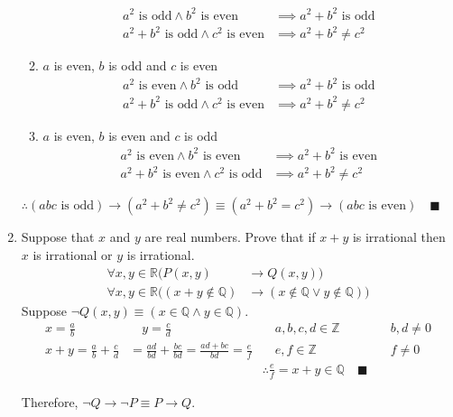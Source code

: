 \documentclass[letterpaper, 12pt]{article}
\newcommand{\qed}{\quad \blacksquare}
\newcommand{\then}{\rightarrow}
\newcommand{\rationals}{\mathbb{Q}}
\newcommand{\reals}{\mathbb{R}}
\begin{document}
\begin{enumerate}
\begin{enumerate}
    \begin{align*}
        a^2 \text{ is odd} \wedge b^2 \text{ is even} &\implies a^2 + b^2 \text{ is odd} \\
        a^2 + b^2 \text{ is odd} \wedge c^2 \text{ is even} &\implies a^2 + b^2 \ne c^2
    \end{align*}
    \item $a$ is even, $b$ is odd and $c$ is even
    \begin{align*}
        a^2 \text{ is even} \wedge b^2 \text{ is odd} &\implies a^2 + b^2 \text{ is odd} \\
        a^2 + b^2 \text{ is odd} \wedge c^2 \text{ is even} &\implies a^2 + b^2 \ne c^2
    \end{align*}
    \item $a$ is even, $b$ is even and $c$ is odd
    \begin{align*}
        a^2 \text{ is even} \wedge b^2 \text{ is even} &\implies a^2 + b^2 \text{ is even} \\
        a^2 + b^2 \text{ is even} \wedge c^2 \text{ is odd} &\implies a^2 + b^2 \ne c^2
    \end{align*}
\end{enumerate}
$\therefore (\text{$abc$ is odd}) \then (a^2 + b^2 \ne c^2) 
\equiv (a^2 + b^2 = c^2) \then (\text{$abc$ is even}) \qed$
\pagebreak
\item Suppose that $x$ and $y$ are real numbers. Prove that if $x + y$ is irrational then $x$ 
is irrational or $y$ is irrational.
\begin{align*}
    \forall x, y \in \reals (P(x, y) &\then Q(x, y)) \\
    \forall x, y \in \reals ((x + y \notin \rationals) &\then (x \notin \rationals \vee y \notin 
    \rationals))
\end{align*}
Suppose $\neg Q(x, y) \equiv (x \in \rationals \wedge y \in \rationals)$. \\
\begin{align*}
    x = \frac{a}{b} & \quad y = \frac{c}{d} &\quad a, b, c, d \in \mathbb{Z} &\quad b, d \ne 0 \\
    x + y = \frac{a}{b} + \frac{c}{d} &= \frac{ad}{bd} + \frac{bc}{bd} = \frac{ad + bc}{bd}
    = \frac{e}{f} &\quad e, f \in \mathbb{Z} &\quad f \ne 0 \\
    & & \therefore \frac{e}{f} = x + y \in \mathbb{Q} \qed
\end{align*}
\begin{flushleft}
    Therefore, $\neg Q \then \neg P \equiv P \then Q$.
\end{flushleft}

\end{enumerate}
\end{document}
